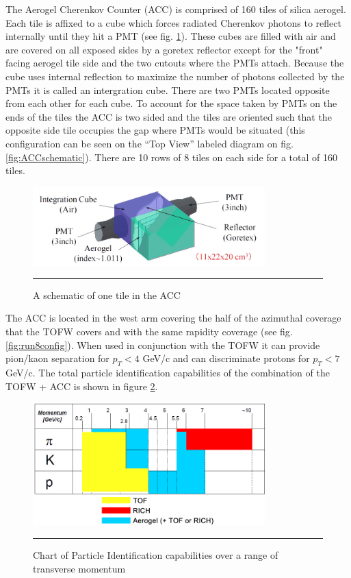 The Aerogel Cherenkov Counter (ACC) is comprised of 160 tiles of silica aerogel. Each tile is affixed to a cube which forces radiated Cherenkov photons to reflect internally until they hit a PMT (see fig. \ref{fig:accchannel}). These cubes are filled with air and are covered on all exposed sides by a goretex reflector except for the "front" facing aerogel tile side and the two cutouts where the PMTs attach. Because the cube uses internal reflection to maximize the number of photons collected by the PMTs it is called an intergration cube. There are two PMTs located opposite from each other for each cube. To account for the space taken by PMTs on the ends of the tiles the ACC is two sided and the tiles are oriented such that the opposite side tile occupies the gap where PMTs would be situated (this configuration can be seen on the ``Top View'' labeled diagram on fig. \ref{fig:ACCschematic}). There are 10 rows of 8 tiles on each side for a total of 160 tiles.

\begin{figure}[htbp!]
  \centering
    \includegraphics[width=0.8\textwidth]{Figures/aerogelchannel.JPG}
    \rule{35em}{0.5pt}
  \caption[A schematic of one tile in the ACC]{A schematic of one tile in the ACC}
  \label{fig:accchannel}
\end{figure}

The ACC is located in the west arm covering the half of the azimuthal coverage that the TOFW covers and with the same rapidity coverage (see fig. \ref{fig:run8config}). When used in conjunction with the TOFW it can provide pion/kaon separation for $p_{T} < 4$ GeV/c and can discriminate protons for $p_{T} < 7$ GeV/c.  The total particle identification capabilities of the combination of the TOFW + ACC is shown in figure \ref{fig:PIDrange}.

\begin{figure}[h!]
  \centering
    \includegraphics[width=0.8\textwidth]{Figures/accrange.jpg}
    \rule{35em}{0.5pt}
  \caption[Chart of Particle Identification capabilities over a range of transverse momentum]{Chart of Particle Identification capabilities over a range of transverse momentum}
  \label{fig:PIDrange}
\end{figure}

